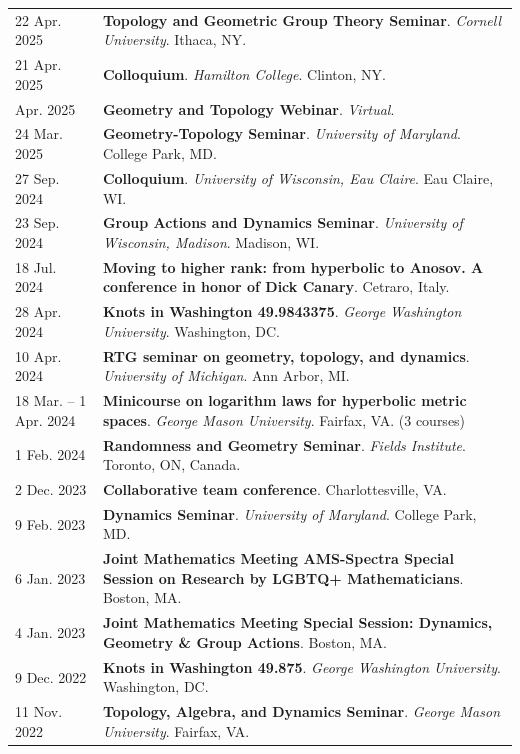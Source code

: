 \begin{center}
{\begin{longtable}{p{}  p{}}
22 Apr.  2025 & \textbf{Topology and Geometric Group Theory Seminar}. \textit{Cornell University}.  Ithaca, NY.  \\ 
21 Apr.  2025 & \textbf{Colloquium}. \textit{Hamilton College}.  Clinton, NY.  \\ 
 Apr.  2025 & \textbf{Geometry and Topology Webinar}. \textit{Virtual}.  \\ 
24 Mar.  2025 & \textbf{Geometry-Topology Seminar}. \textit{University of Maryland}.  College Park, MD.  \\ 
27 Sep.  2024 & \textbf{Colloquium}. \textit{University of Wisconsin, Eau Claire}.  Eau Claire, WI.  \\ 
23 Sep.  2024 & \textbf{Group Actions and Dynamics Seminar}. \textit{University of Wisconsin, Madison}.  Madison, WI.  \\ 
18 Jul.  2024 & \textbf{Moving to higher rank: 
from hyperbolic to Anosov.
A conference in honor of Dick Canary}.  Cetraro, Italy.  \\ 
28 Apr.  2024 & \textbf{Knots in Washington 49.9843375}. \textit{George Washington University}.  Washington, DC.  \\ 
10 Apr.  2024 & \textbf{RTG seminar on geometry, topology, and dynamics}. \textit{University of Michigan}.  Ann Arbor, MI.  \\ 
18 Mar.  -- 1 Apr.  2024 & \textbf{Minicourse on logarithm laws for hyperbolic metric spaces}. \textit{George Mason University}.  Fairfax, VA. (3 courses) \\ 
1 Feb.  2024 & \textbf{Randomness and Geometry Seminar}. \textit{Fields Institute}.  Toronto, ON, Canada.  \\ 
2 Dec.  2023 & \textbf{Collaborative team conference}.  Charlottesville, VA.  \\ 
9 Feb.  2023 & \textbf{Dynamics Seminar}. \textit{University of Maryland}.  College Park, MD.  \\ 
6 Jan.  2023 & \textbf{Joint Mathematics Meeting AMS-Spectra Special Session on Research by LGBTQ+ Mathematicians}.  Boston, MA.  \\ 
4 Jan.  2023 & \textbf{Joint Mathematics Meeting Special Session: Dynamics, Geometry \& Group Actions}.  Boston, MA.  \\ 
9 Dec.  2022 & \textbf{Knots in Washington 49.875}. \textit{George Washington University}.  Washington, DC.  \\ 
11 Nov.  2022 & \textbf{Topology, Algebra, and Dynamics Seminar}. \textit{George Mason University}.  Fairfax, VA.  \\ 

\end{longtable}}
\end{center}
